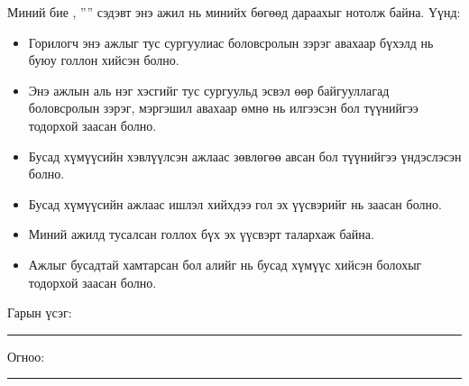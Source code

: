 \begin{declaration}
\addchaptertocentry{\authorshipname}


\noindent Миний бие \shortname, ''{\ttitle}'' сэдэвт энэ ажил нь минийх бөгөөд дараахыг нотолж байна. Үүнд:

\begin{itemize} 
\item Горилогч энэ ажлыг тус сургуулиас боловсролын зэрэг авахаар бүхэлд нь буюу голлон хийсэн болно.
\item Энэ ажлын аль нэг хэсгийг тус сургуульд эсвэл өөр байгууллагад боловсролын зэрэг, мэргэшил авахаар өмнө нь илгээсэн бол түүнийгээ тодорхой заасан болно.
\item Бусад хүмүүсийн хэвлүүлсэн ажлаас зөвлөгөө авсан бол түүнийгээ үндэслэсэн болно.
\item Бусад хүмүүсийн ажлаас ишлэл хийхдээ гол эх үүсвэрийг нь заасан болно.
\item Миний ажилд тусалсан голлох бүх эх үүсвэрт талархаж байна.
\item Ажлыг бусадтай хамтарсан бол алийг нь бусад хүмүүс хийсэн болохыг тодорхой заасан болно.
\end{itemize}
\bigskip
 
\noindent Гарын үсэг: \rule[-0.5em]{12.7em}{0.5pt}
\bigskip

\noindent Огноо: \rule[-0.5em]{15em}{0.5pt}

\end{declaration}

\clearpage

